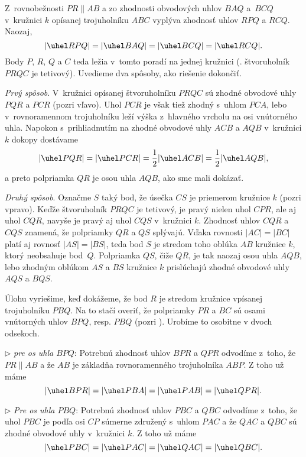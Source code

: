 {%
Z~rovnobežnosti $PR\parallel AB$ a zo zhodnosti obvodových uhlov
$BAQ$ a~$BCQ$ v~kružnici $k$ opísanej trojuholníku $ABC$ vyplýva zhodnosť
uhlov $RPQ$ a $RCQ$. Naozaj,
$$
|\uhel RPQ|=|\uhel BAQ|=|\uhel BCQ|=|\uhel RCQ|.
$$
Body $P$, $R$, $Q$ a $C$ teda ležia v~tomto poradí na jednej
kružnici (\tj. štvoruholník $PRQC$ je tetivový).
Uvedieme dva spôsoby, ako riešenie dokončiť.

\emph{Prvý spôsob}.
V~kružnici opísanej štvoruholníku $PRQC$ sú zhodné
obvodové uhly $PQR$ a $PCR$ (pozri \obr{} vľavo).
Uhol $PCR$ je však tiež zhodný s~uhlom $PCA$,
lebo v~rovnoramennom trojuholníku leží výška
z~hlavného vrcholu na osi vnútorného uhla. Napokon s~prihliadnutím
na zhodné obvodové uhly $ACB$ a $AQB$ v~kružnici $k$
dokopy dostávame
$$
|\uhel PQR|=|\uhel PCR|=\frac12|\uhel ACB|=\frac12|\uhel AQB|,
$$
a preto polpriamka $QR$ je osou uhla $AQB$, ako sme mali dokázať.

\emph{Druhý spôsob}.
Označme $S$ taký bod, že úsečka $CS$ je priemerom kružnice $k$
(pozri  vpravo).
Keďže štvoruholník $PRQC$ je tetivový, je pravý nielen uhol $CPR$,
ale aj uhol $CQR$, navyše je pravý aj uhol $CQS$ v~kružnici $k$.
Zhodnosť uhlov $CQR$ a~$CQS$ znamená, že polpriamky $QR$ a $QS$
splývajú. Vďaka rovnosti $|AC|=|BC|$ platí aj rovnosť
$|AS|=|BS|$, teda bod $S$ je stredom toho oblúka $AB$
kružnice $k$, ktorý neobsahuje bod~$Q$. Polpriamka $QS$,
čiže $QR$, je tak naozaj osou uhla $AQB$, lebo zhodným oblúkom
$AS$ a $BS$ kružnice $k$ prislúchajú zhodné obvodové uhly $AQS$ a $BQS$.
%

\ineriesenie
Úlohu vyriešime, keď dokážeme, že bod $R$ je stredom kružnice vpísanej
trojuholníku $PBQ$. Na to stačí overiť, že polpriamky $PR$ a $BC$ sú
osami vnútorných uhlov $BPQ$, resp. $PBQ$ (pozri \obr).
Urobíme to osobitne v dvoch odsekoch.

\item{$\triangleright$} \emph{pre os uhla $BPQ$}: Potrebnú zhodnosť uhlov $BPR$ a
$QPR$ odvodíme z~toho, že $PR\parallel AB$ a že $AB$ je základňa
rovnoramenného trojuholníka $ABP$. Z toho už máme
$$
|\uhel BPR|=|\uhel PBA| =|\uhel PAB|=|\uhel QPR|.
$$

\item{$\triangleright$} \emph{Pre os uhla $PBQ$}: Potrebnú zhodnosť uhlov $PBC$
a $QBC$ odvodíme z~toho, že uhol $PBC$ je podľa osi $CP$
súmerne združený s~uhlom $PAC$ a že $QAC$ a $QBC$ sú
zhodné obvodové uhly v~kružnici $k$. Z toho už máme
$$
|\uhel PBC|=|\uhel PAC|=|\uhel QAC|=|\uhel QBC|.
$$
%


}
